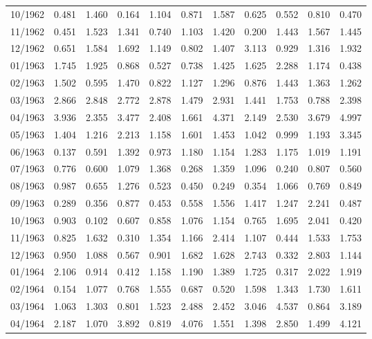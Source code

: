 \begin{tabular}{lrrrrrrrrrr}
10/1962 &  0.481 &  1.460 &  0.164 &  1.104 &  0.871 &  1.587 &  0.625 &  0.552 &  0.810 &  0.470 \\
11/1962 &  0.451 &  1.523 &  1.341 &  0.740 &  1.103 &  1.420 &  0.200 &  1.443 &  1.567 &  1.445 \\
12/1962 &  0.651 &  1.584 &  1.692 &  1.149 &  0.802 &  1.407 &  3.113 &  0.929 &  1.316 &  1.932 \\
01/1963 &  1.745 &  1.925 &  0.868 &  0.527 &  0.738 &  1.425 &  1.625 &  2.288 &  1.174 &  0.438 \\
02/1963 &  1.502 &  0.595 &  1.470 &  0.822 &  1.127 &  1.296 &  0.876 &  1.443 &  1.363 &  1.262 \\
03/1963 &  2.866 &  2.848 &  2.772 &  2.878 &  1.479 &  2.931 &  1.441 &  1.753 &  0.788 &  2.398 \\
04/1963 &  3.936 &  2.355 &  3.477 &  2.408 &  1.661 &  4.371 &  2.149 &  2.530 &  3.679 &  4.997 \\
05/1963 &  1.404 &  1.216 &  2.213 &  1.158 &  1.601 &  1.453 &  1.042 &  0.999 &  1.193 &  3.345 \\
06/1963 &  0.137 &  0.591 &  1.392 &  0.973 &  1.180 &  1.154 &  1.283 &  1.175 &  1.019 &  1.191 \\
07/1963 &  0.776 &  0.600 &  1.079 &  1.368 &  0.268 &  1.359 &  1.096 &  0.240 &  0.807 &  0.560 \\
08/1963 &  0.987 &  0.655 &  1.276 &  0.523 &  0.450 &  0.249 &  0.354 &  1.066 &  0.769 &  0.849 \\
09/1963 &  0.289 &  0.356 &  0.877 &  0.453 &  0.558 &  1.556 &  1.417 &  1.247 &  2.241 &  0.487 \\
10/1963 &  0.903 &  0.102 &  0.607 &  0.858 &  1.076 &  1.154 &  0.765 &  1.695 &  2.041 &  0.420 \\
11/1963 &  0.825 &  1.632 &  0.310 &  1.354 &  1.166 &  2.414 &  1.107 &  0.444 &  1.533 &  1.753 \\
12/1963 &  0.950 &  1.088 &  0.567 &  0.901 &  1.682 &  1.628 &  2.743 &  0.332 &  2.803 &  1.144 \\
01/1964 &  2.106 &  0.914 &  0.412 &  1.158 &  1.190 &  1.389 &  1.725 &  0.317 &  2.022 &  1.919 \\
02/1964 &  0.154 &  1.077 &  0.768 &  1.555 &  0.687 &  0.520 &  1.598 &  1.343 &  1.730 &  1.611 \\
03/1964 &  1.063 &  1.303 &  0.801 &  1.523 &  2.488 &  2.452 &  3.046 &  4.537 &  0.864 &  3.189 \\
04/1964 &  2.187 &  1.070 &  3.892 &  0.819 &  4.076 &  1.551 &  1.398 &  2.850 &  1.499 &  4.121 \\

\end{tabular}

